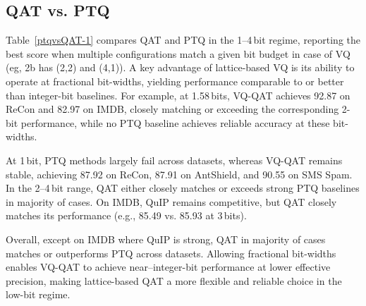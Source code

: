\documentclass{article}
\theoremstyle{definition}
\theoremstyle{remark}
\begin{document}
\subsection{QAT vs. PTQ}
Table~\ref{ptqvsQAT-1} compares QAT and PTQ in the 1–4\,bit regime, reporting the best score when multiple configurations match a given bit budget in case of VQ (eg, 2b has (2,2) and (4,1)). A key advantage of lattice-based VQ is its ability to operate at fractional bit-widths, yielding performance comparable to or better than integer-bit baselines. For example, at 1.58\,bits, VQ-QAT achieves 92.87 on ReCon and 82.97 on IMDB, closely matching or exceeding the corresponding 2-bit performance, while no PTQ baseline achieves reliable accuracy at these bit-widths.

At 1\,bit, PTQ methods largely fail across datasets, whereas VQ-QAT remains stable, achieving 87.92 on ReCon, 87.91 on AntShield, and 90.55 on SMS Spam. In the 2–4\,bit range, QAT either closely matches or exceeds strong PTQ baselines in majority of cases. On IMDB, QuIP remains competitive, but QAT closely matches its performance (e.g., 85.49 vs. 85.93 at 3\,bits).

Overall, except on IMDB where QuIP is strong, QAT in majority of cases matches or outperforms PTQ across datasets. Allowing fractional bit-widths enables VQ-QAT to achieve near–integer-bit performance at lower effective precision, making lattice-based QAT a more flexible and reliable choice in the low-bit regime.
\end{document}
